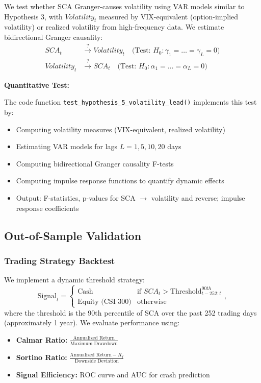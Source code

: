 \documentclass[preprint,12pt,authoryear]{elsarticle}
\begin{document}
We test whether SCA Granger-causes volatility using VAR models similar to Hypothesis 3, with $Volatility_t$ measured by VIX-equivalent (option-implied volatility) or realized volatility from high-frequency data. We estimate bidirectional Granger causality:
\begin{align}
SCA_t &\stackrel{?}{\to} Volatility_t \quad \text{(Test: } H_0: \gamma_1 = \ldots = \gamma_L = 0\text{)} \\
Volatility_t &\stackrel{?}{\to} SCA_t \quad \text{(Test: } H_0: \alpha_1 = \ldots = \alpha_L = 0\text{)}
\end{align}

\noindent
\textbf{Quantitative Test:}

The code function \texttt{test\_hypothesis\_5\_volatility\_lead()} implements this test by:
\begin{itemize}
\item Computing volatility measures (VIX-equivalent, realized volatility)
\item Estimating VAR models for lags $L = 1, 5, 10, 20$ days
\item Computing bidirectional Granger causality F-tests
\item Computing impulse response functions to quantify dynamic effects
\item Output: F-statistics, p-values for SCA $\to$ volatility and reverse; impulse response coefficients
\end{itemize}

\subsection{Out-of-Sample Validation}

\subsubsection{Trading Strategy Backtest}

We implement a dynamic threshold strategy:
\begin{equation}
\text{Signal}_t = \begin{cases}
\text{Cash} & \text{if } SCA_t > \text{Threshold}_{t-252:t}^{90th} \\
\text{Equity (CSI 300)} & \text{otherwise}
\end{cases},
\end{equation}
where the threshold is the 90th percentile of SCA over the past 252 trading days (approximately 1 year). We evaluate performance using:
\begin{itemize}
\item \textbf{Calmar Ratio:} $\frac{\text{Annualized Return}}{\text{Maximum Drawdown}}$
\item \textbf{Sortino Ratio:} $\frac{\text{Annualized Return} - R_f}{\text{Downside Deviation}}$
\item \textbf{Signal Efficiency:} ROC curve and AUC for crash prediction
\end{itemize}
\end{document}
